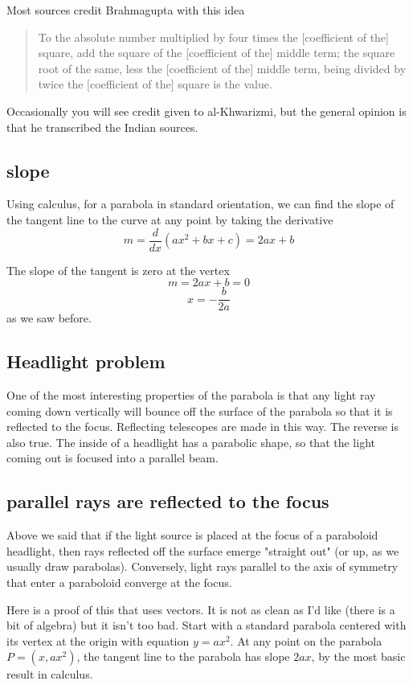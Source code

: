 \documentclass[11pt, oneside]{article}
\begin{document}
Most sources credit Brahmagupta with this idea
\begin{quote}To the absolute number multiplied by four times the [coefficient of the] square, add the square of the [coefficient of the] middle term; the square root of the same, less the [coefficient of the] middle term, being divided by twice the [coefficient of the] square is the value.\end{quote}

Occasionally you will see credit given to al-Khwarizmi, but the general opinion is that he transcribed the Indian sources.

\subsection*{slope}
Using calculus, for a parabola in standard orientation, we can find the slope of the tangent line to the curve at any point by taking the derivative
\[ m = \frac{d}{dx} (ax^2 + bx + c) = 2ax + b \]

The slope of the tangent is zero at the vertex
\[ m = 2ax + b = 0 \]
\[ x = -\frac{b}{2a} \]
as we saw before.

\subsection*{Headlight problem}

One of the most interesting properties of the parabola is that any light ray coming down vertically will bounce off the surface of the parabola so that it is reflected to the focus.  Reflecting telescopes are made in this way.  The reverse is also true.  The inside of a headlight has a parabolic shape, so that the light coming out is focused into a parallel beam.

\subsection*{parallel rays are reflected to the focus}
Above we said that if the light source is placed at the focus of a paraboloid headlight, then rays reflected off the surface emerge "straight out" (or up, as we usually draw parabolas).  Conversely, light rays parallel to the axis of symmetry that enter a paraboloid converge at the focus.

Here is a proof of this that uses vectors.  It is not as clean as I'd like (there is a bit of algebra) but it isn't too bad.  Start with a standard parabola centered with its vertex at the origin with equation $y=ax^2$.  At any point on the parabola $P = (x,ax^2)$, the tangent line to the parabola has slope $2ax$, by the most basic result in calculus.
\end{document}
